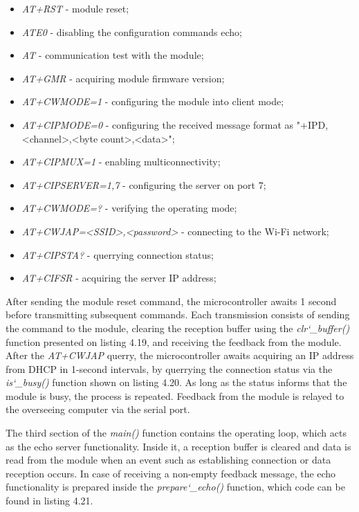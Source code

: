\begin{itemize}
    \item [$\bullet$] \emph{AT+RST} - module reset;
    \item [$\bullet$] \emph{ATE0} - disabling the configuration commands echo;
    \item [$\bullet$] \emph{AT} - communication test with the module;
    \item [$\bullet$] \emph{AT+GMR} - acquiring module firmware version;
    \item [$\bullet$] \emph{AT+CWMODE=1} - configuring the module into client mode;
    \item [$\bullet$] \emph{AT+CIPMODE=0} - configuring the received message format as "+IPD,\newline<channel>,<byte count>,<data>";
    \item [$\bullet$] \emph{AT+CIPMUX=1} - enabling multiconnectivity;
    \item [$\bullet$] \emph{AT+CIPSERVER=1,7} - configuring the server on port 7;
    \item [$\bullet$] \emph{AT+CWMODE=?} - verifying the operating mode;
    \item [$\bullet$] \emph{AT+CWJAP=<SSID>,<password>} - connecting to the Wi-Fi network;
    \item [$\bullet$] \emph{AT+CIPSTA?} - querrying connection status;
    \item [$\bullet$] \emph{AT+CIFSR} - acquiring the server IP address;
\end{itemize}

After sending the module reset command, the microcontroller awaits 1 second before transmitting subsequent commands. Each transmission consists of sending the command to the module, clearing the reception buffer using the \textit{clr\char`_buffer()} function presented on listing 4.19, and receiving the feedback from the module. After the \emph{AT+CWJAP} querry, the microcontroller awaits acquiring an IP address from DHCP in 1-second intervals, by querrying the connection status via the \textit{is\char`_busy()} function shown on listing 4.20. As long as the status informs that the module is busy, the process is repeated. Feedback from the module is relayed to the overseeing computer via the serial port. 


\newpage
{}

The third section of the \textit{main()} function contains the operating loop, which acts as the echo server functionality. Inside it, a reception buffer is cleared and data is read from the module when an event such as establishing connection or data reception occurs. In case of receiving a non-empty feedback message, the echo functionality is prepared inside the \textit{prepare\char`_echo()} function, which code can be found in listing 4.21.

